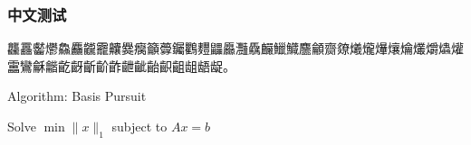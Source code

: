 \documentclass{ltx-talk}
\begin{document}
	
	
	\begin{frame}
		\frametitle{中文测试}
		龘靐齾爩鱻麤龖龗齉爨癵籲虋钃鸜麷鼺厵灩驫麣鱲鱵麢龥齌爒爔爖爗爙爚爜爝爞爟靁鸞龢龤齕齖齗齘齚齛齜齝齞齟龃龉龊。
	\end{frame}
	
	\begin{frame}{Algorithm: Basis Pursuit}
		\begin{algorithm}[H]
			\caption{L1-Minimization}
			Solve $\min \|x\|_1$ subject to $Ax = b$\;
		\end{algorithm}
	\end{frame}
	
\end{document}
